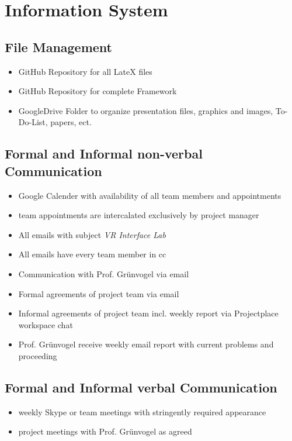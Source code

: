 \documentclass[a4paper, 12pt]{article}
\begin{document}
\section{Information System}
\subsection{File Management}
\begin{itemize}
\item GitHub Repository for all LateX files
\item GitHub Repository for complete Framework
\item GoogleDrive Folder to organize presentation files, graphics and images, To-Do-List, papers, ect. 
\end{itemize}

\subsection{Formal and Informal non-verbal Communication}
\begin{itemize}
\item Google Calender with availability of all team members and appointments
\item team appointments are  intercalated exclusively by project manager
\item All emails with subject \textit{VR Interface Lab} 
\item All emails have every team member in cc
\item Communication with Prof. Grünvogel via email
\item Formal agreements of project team via email
\item Informal agreements of project team incl. weekly report via Projectplace workspace chat
\item Prof. Grünvogel receive weekly email report with current problems and proceeding 
\end{itemize}
\subsection{Formal and Informal verbal Communication}
\begin{itemize}
	\item weekly Skype or team meetings with stringently required appearance
	\item project meetings with Prof. Grünvogel as agreed 
\end{itemize}
\end{document}
